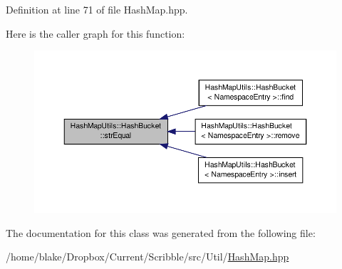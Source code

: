 Definition at line 71 of file Hash\-Map.\-hpp.



Here is the caller graph for this function\-:
\nopagebreak
\begin{figure}[H]
\begin{center}
\leavevmode
\includegraphics[width=350pt]{class_hash_map_utils_1_1_hash_bucket_a939e10a16348fc29380553d9fd4e0f97_icgraph}
\end{center}
\end{figure}




The documentation for this class was generated from the following file\-:\begin{DoxyCompactItemize}
\item 
/home/blake/\-Dropbox/\-Current/\-Scribble/src/\-Util/\hyperlink{_hash_map_8hpp}{Hash\-Map.\-hpp}\end{DoxyCompactItemize}

